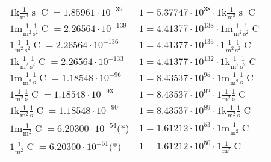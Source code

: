 \begin{center}
\begin{longtable}{l l}
{\color{gray}$1 \bm{\mathrm{ k}}\frac1{\operatorname{m}^3}{\operatorname{s}}{\operatorname{C}}{} = 1.85961\cdot10^{-39} $}   & {\color{gray}$ 1 = 5.37747\cdot10^{38} \cdot 1 \bm{\mathrm{ k}}\frac1{\operatorname{m}^3}{\operatorname{s}}{\operatorname{C}}{}$}  \\
{\color{gray}$1 \bm{\mathrm{ m}}\frac1{\operatorname{m}^2}\frac1{\operatorname{s}^2}{\operatorname{C}}{} = 2.26564\cdot10^{-139} $}   & {\color{gray}$ 1 = 4.41377\cdot10^{138} \cdot 1 \bm{\mathrm{ m}}\frac1{\operatorname{m}^2}\frac1{\operatorname{s}^2}{\operatorname{C}}{}$}  \\
{\color{black}$1 \bm{\mathrm{ }}\frac1{\operatorname{m}^2}\frac1{\operatorname{s}^2}{\operatorname{C}}{} = 2.26564\cdot10^{-136} $}   & {\color{black}$ 1 = 4.41377\cdot10^{135} \cdot 1 \bm{\mathrm{ }}\frac1{\operatorname{m}^2}\frac1{\operatorname{s}^2}{\operatorname{C}}{}$}  \\
{\color{gray}$1 \bm{\mathrm{ k}}\frac1{\operatorname{m}^2}\frac1{\operatorname{s}^2}{\operatorname{C}}{} = 2.26564\cdot10^{-133} $}   & {\color{gray}$ 1 = 4.41377\cdot10^{132} \cdot 1 \bm{\mathrm{ k}}\frac1{\operatorname{m}^2}\frac1{\operatorname{s}^2}{\operatorname{C}}{}$}  \\
{\color{gray}$1 \bm{\mathrm{ m}}\frac1{\operatorname{m}^2}\frac1{\operatorname{s}}{\operatorname{C}}{} = 1.18548\cdot10^{-96} $}   & {\color{gray}$ 1 = 8.43537\cdot10^{95} \cdot 1 \bm{\mathrm{ m}}\frac1{\operatorname{m}^2}\frac1{\operatorname{s}}{\operatorname{C}}{}$}  \\
{\color{black}$1 \bm{\mathrm{ }}\frac1{\operatorname{m}^2}\frac1{\operatorname{s}}{\operatorname{C}}{} = 1.18548\cdot10^{-93} $}   & {\color{black}$ 1 = 8.43537\cdot10^{92} \cdot 1 \bm{\mathrm{ }}\frac1{\operatorname{m}^2}\frac1{\operatorname{s}}{\operatorname{C}}{}$}  \\
{\color{gray}$1 \bm{\mathrm{ k}}\frac1{\operatorname{m}^2}\frac1{\operatorname{s}}{\operatorname{C}}{} = 1.18548\cdot10^{-90} $}   & {\color{gray}$ 1 = 8.43537\cdot10^{89} \cdot 1 \bm{\mathrm{ k}}\frac1{\operatorname{m}^2}\frac1{\operatorname{s}}{\operatorname{C}}{}$}  \\
{\color{gray}$1 \bm{\mathrm{ m}}\frac1{\operatorname{m}^2}{}{\operatorname{C}}{} = 6.20300\cdot10^{-54} $}\quad(*) & {\color{gray}$ 1 = 1.61212\cdot10^{53} \cdot 1 \bm{\mathrm{ m}}\frac1{\operatorname{m}^2}{}{\operatorname{C}}{}$}  \\
{\color{black}$1 \bm{\mathrm{ }}\frac1{\operatorname{m}^2}{}{\operatorname{C}}{} = 6.20300\cdot10^{-51} $}\quad(*) & {\color{black}$ 1 = 1.61212\cdot10^{50} \cdot 1 \bm{\mathrm{ }}\frac1{\operatorname{m}^2}{}{\operatorname{C}}{}$}  \\

\end{longtable}
\end{center}
